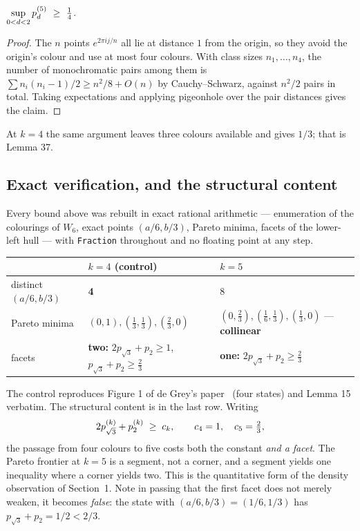 \begin{proposition}
$\displaystyle \sup_{0<d<2}\pk{5}{d}\ \ge\ \tfrac14$.
\end{proposition}

\begin{proof}
The $n$ points $e^{2\pi ij/n}$ all lie at distance $1$ from the origin, so they
avoid the origin's colour and use at most four colours. With class sizes
$n_1,\dots,n_4$, the number of monochromatic pairs among them is
$\sum n_i(n_i-1)/2\ge n^2/8+O(n)$ by Cauchy--Schwarz, against $n^2/2$ pairs in
total. Taking expectations and applying pigeonhole over the pair distances gives
the claim.
\end{proof}

At $k=4$ the same argument leaves three colours available and gives $1/3$; that
is Lemma 37.

\subsection{Exact verification, and the structural content}
\label{sec:hull}

Every bound above was rebuilt in exact rational arithmetic --- enumeration of
the colourings of $W_6$, exact points $(a/6,b/3)$, Pareto minima, facets of the
lower-left hull --- with \texttt{Fraction} throughout and no floating point at
any step.

\begin{center}
\begin{tabular}{@{}lll@{}}
\toprule
& $k=4$ (control) & $k=5$ \\
\midrule
distinct $(a/6,b/3)$ & \textbf{4} & 8 \\
Pareto minima & $(0,1),(\tfrac13,\tfrac13),(\tfrac23,0)$
& $(0,\tfrac23),(\tfrac16,\tfrac13),(\tfrac13,0)$ --- \textbf{collinear} \\
facets & \textbf{two:} $2p_{\sqrt3}+p_2\ge1$, $p_{\sqrt3}+p_2\ge\tfrac23$
& \textbf{one:} $2p_{\sqrt3}+p_2\ge\tfrac23$ \\
\bottomrule
\end{tabular}
\end{center}

The control reproduces Figure 1 of de Grey's paper~\cite{deGrey2018} (four states) and Lemma 15
verbatim. The structural content is in the last row. Writing
\[
2p^{(k)}_{\sqrt3}+p^{(k)}_{2}\;\ge\;c_k, \qquad c_4=1,\quad c_5=\tfrac23,
\]
the passage from four colours to five costs both the constant \emph{and a
facet}. The Pareto frontier at $k=5$ is a segment, not a corner, and a segment
yields one inequality where a corner yields two. This is the quantitative form
of the density observation of Section~1. Note in passing that the first facet does not merely
weaken, it becomes \emph{false}: the state with $(a/6,b/3)=(1/6,1/3)$ has
$p_{\sqrt3}+p_2=1/2<2/3$.

